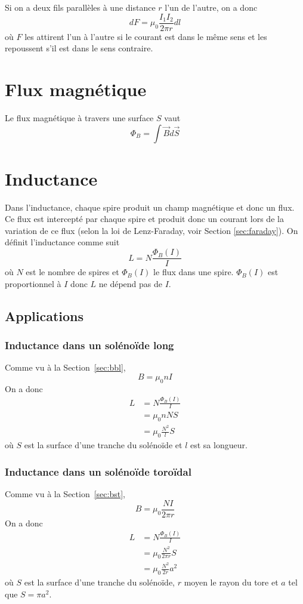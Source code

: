 \documentclass[11pt,a4paper]{article}
\newcommand{\B}{\vec B}
\begin{document}
Si on a deux fils parallèles à une distance $r$ l'un de l'autre, on a donc
\[ dF = \mu_0\frac{I_1I_2}{2\pi r}dl \]
où $F$ les attirent l'un à l'autre si le courant est dans le même sens et les repoussent s'il est dans le sens contraire.

\section{Flux magnétique}
Le flux magnétique à travers une surface $S$ vaut
\[ \Phi_B = \int \B d\vec S \]

\section{Inductance}
Dans l'inductance, chaque spire produit un champ magnétique et donc un flux.
Ce flux est intercepté par chaque spire et produit donc un courant lors de la variation de ce flux (selon la loi de Lenz-Faraday, voir Section \ref{sec:faraday}).
On définit l'inductance comme suit
\[ L = N\frac{\Phi_B(I)}{I} \]
où $N$ est le nombre de spires et $\Phi_B(I)$ le flux dans une spire.
$\Phi_B(I)$ est proportionnel à $I$ donc $L$ ne dépend pas de $I$.

\subsection{Applications}
\subsubsection{Inductance dans un solénoïde long}
Comme vu à la Section~\ref{sec:bbl},
\[ B = \mu_0nI \]
On a donc
\begin{align*}
	L &= N\frac{\Phi_B(I)}{I}\\
	&= \mu_0 nNS\\
	&= \mu_0 \frac{N^2}{l}S
\end{align*}
où $S$ est la surface d'une tranche du solénoïde et $l$ est sa longueur.

\subsubsection{Inductance dans un solénoïde toroïdal}
Comme vu à la Section~\ref{sec:bst},
\[ B = \mu_0\frac{NI}{2\pi r} \]
On a donc
\begin{align*}
	L &= N\frac{\Phi_B(I)}{I}\\
	&= \mu_0 \frac{N^2}{2\pi r}S\\
	&= \mu_0 \frac{N^2}{2r}a^2
\end{align*}
où $S$ est la surface d'une tranche du solénoïde, $r$ moyen le rayon du tore et $a$ tel que $S = \pi a^2$.
\end{document}
